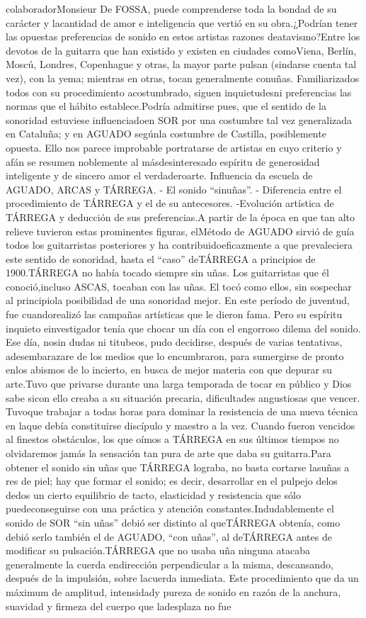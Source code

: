 \documentclass[
11pt, %
a4paper, %
oneside, %
headinclude,footinclude, %
BCOR5mm, %
]{scrartcl}
\begin{document}
{colaboradorMonsieur De FOSSA, puede comprenderse toda la bondad de su carácter y lacantidad de amor e inteligencia que vertió en su obra.¿Podrían tener las opuestas preferencias de sonido en estos artistas razones deatavismo?Entre los devotos de la guitarra que han existido y existen en ciudades comoViena, Berlín, Moscú, Londres, Copenhague y otras, la mayor parte pulsan (sindarse cuenta tal vez), con la yema; mientras en otras, tocan generalmente conuñas. Familiarizados todos con su procedimiento acostumbrado, siguen inquietudesni preferencias las normas que el hábito establece.Podría admitirse pues, que el sentido de la sonoridad estuviese influenciadoen SOR por una costumbre tal vez generalizada en Cataluña; y en AGUADO segúnla costumbre de Castilla, posiblemente opuesta. Ello nos parece improbable portratarse de artistas en cuyo criterio y afán se resumen noblemente al másdesinteresado espíritu de generosidad inteligente y de sincero amor el verdaderoarte. Influencia da escuela de AGUADO, ARCAS y TÁRREGA. - El sonido “sinuñas”. - Diferencia entre el procedimiento de TÁRREGA y el de su antecesores. -Evolución artística de TÁRREGA y deducción de sus preferencias.A partir de la época en que tan alto relieve tuvieron estas prominentes figuras, elMétodo de AGUADO sirvió de guía todos los guitarristas posteriores y ha contribuidoeficazmente a que prevaleciera este sentido de sonoridad, hasta el “caso” deTÁRREGA a principios de 1900.TÁRREGA no había tocado siempre sin uñas. Los guitarristas que él conoció,incluso ASCAS, tocaban con las uñas. El tocó como ellos, sin sospechar al principiola posibilidad de una sonoridad mejor. En este período de juventud, fue cuandorealizó las campañas artísticas que le dieron fama. Pero su espíritu inquieto einvestigador tenía que chocar un día con el engorroso dilema del sonido. Ese día, nosin dudas ni titubeos, pudo decidirse, después de varias tentativas, adesembarazare de los medios que lo encumbraron, para sumergirse de pronto enlos abismos de lo incierto, en busca de mejor materia con que depurar su arte.Tuvo que privarse durante una larga temporada de tocar en público y Dios sabe sicon ello creaba a su situación precaria, dificultades angustiosas que vencer. Tuvoque trabajar a todas horas para dominar la resistencia de una nueva técnica en laque debía constituirse discípulo y maestro a la vez. Cuando fueron vencidos al finestos obstáculos, los que oímos a TÁRREGA en sus últimos tiempos no olvidaremos jamás la sensación tan pura de arte que daba su guitarra.Para obtener el sonido sin uñas que TÁRREGA lograba, no basta cortarse lasuñas a res de piel; hay que formar el sonido; es decir, desarrollar en el pulpejo delos dedos un cierto equilibrio de tacto, elasticidad y resistencia que sólo puedeconseguirse con una práctica y atención constantes.Indudablemente el sonido de SOR “sin uñas” debió ser distinto al queTÁRREGA obtenía, como debió serlo también el de AGUADO, “con uñas”, al deTÁRREGA antes de modificar su pulsación.TÁRREGA que no usaba uña ninguna atacaba generalmente la cuerda endirección perpendicular a la misma, descansando, después de la impulsión, sobre lacuerda inmediata. Este procedimiento que da un máximum de amplitud, intensidady pureza de sonido en razón de la anchura, suavidad y firmeza del cuerpo que ladesplaza no fue }
\end{document}
